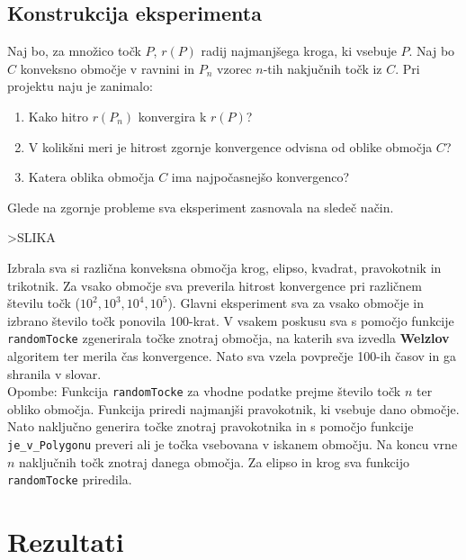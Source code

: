 \documentclass[a4paper]{article}
\begin{document}
\subsection{Konstrukcija eksperimenta}

Naj bo, za množico točk $P$, $r(P)$ radij najmanjšega kroga, ki vsebuje $P$. Naj bo $C$ konveksno območje v ravnini in $P_n$ vzorec $n$-tih nakjučnih točk iz $C$. 
Pri projektu naju je zanimalo:
\begin{enumerate}
\item Kako hitro $r(P_n)$ konvergira k $r(P)$?
\item V kolikšni meri je hitrost zgornje konvergence odvisna od oblike območja $C$?
\item Katera oblika območja $C$ ima najpočasnejšo konvergenco?
\end{enumerate}
Glede na zgornje probleme sva eksperiment zasnovala na sledeč način.

>SLIKA

Izbrala sva si različna konveksna območja krog, elipso, kvadrat, pravokotnik in trikotnik. 
Za vsako območje sva preverila hitrost konvergence pri različnem številu točk ($10^2,10^3,10^4,10^5$).
Glavni eksperiment sva za vsako območje in izbrano število točk ponovila 100-krat. V vsakem poskusu sva s pomočjo funkcije \texttt{randomTocke} zgenerirala točke znotraj območja, na katerih sva izvedla \textbf{Welzlov} algoritem ter merila čas konvergence. Nato sva vzela povprečje 100-ih časov in ga shranila v slovar.\\
Opombe:
\newline Funkcija \texttt{randomTocke} za vhodne podatke prejme število točk $n$ ter obliko območja. Funkcija priredi najmanjši pravokotnik, ki vsebuje dano območje. Nato naključno generira točke znotraj pravokotnika in s pomočjo funkcije \texttt{je\_v\_Polygonu} preveri ali je točka vsebovana v iskanem območju.  Na koncu vrne $n$ naključnih točk znotraj danega območja. 
Za elipso in krog sva funkcijo \texttt{randomTocke} priredila.

\section{Rezultati}
\end{document}
